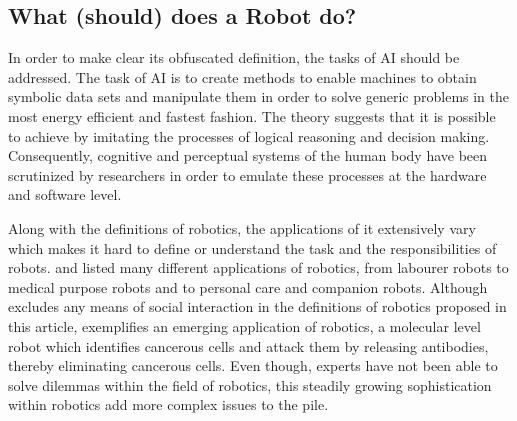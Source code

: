 \documentclass[man]{apa6}
\begin{document}
\subsection{What (should) does a Robot do?}
In order to make clear its obfuscated definition, the tasks of AI should be addressed. The task of AI is to create methods to enable machines to obtain symbolic data sets and manipulate them in order to solve generic problems in the most energy efficient and fastest fashion. The theory suggests that it is possible to achieve by imitating the processes of logical reasoning and decision making. Consequently, cognitive and perceptual systems of the human body have been scrutinized by researchers in order to emulate these processes at the hardware and software level.\par
Along with the definitions of robotics, the applications of it extensively vary which makes it hard to define or understand the task and the responsibilities of robots.  and  listed many different applications of robotics, from labourer robots to medical purpose robots and to personal care and companion robots.
Although  excludes any means of social interaction in the definitions of robotics proposed in this article,  exemplifies an emerging application of robotics, a molecular level robot which identifies cancerous cells and attack them by releasing antibodies, thereby eliminating cancerous cells. Even though, experts have not been able to solve dilemmas within the field of robotics, this steadily growing sophistication within robotics add more complex issues to the pile.
\end{document}
